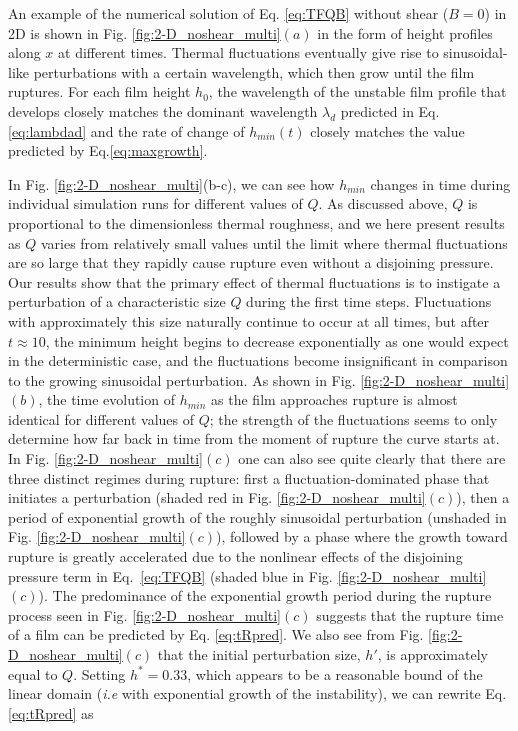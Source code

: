 \documentclass[
 onecolumn,
 amsmath,amssymb,
floatfix,superscriptaddress
]{revtex4-2}
\begin{document}
An example of the numerical solution of Eq. \eqref{eq:TFQB} without shear ($B=0$) in 2D is shown in Fig. \ref{fig:2-D_noshear_multi}$(a)$ in the form of height profiles along $x$ at different times. Thermal fluctuations eventually give rise to sinusoidal-like perturbations with a certain wavelength, which then grow until the film ruptures. For each film height $h_0$, the wavelength of the unstable film profile that develops closely matches the dominant wavelength $\lambda _d$ predicted in Eq. \eqref{eq:lambdad} and the rate of change of $h_{min}(t)$ closely matches the value predicted by Eq.\eqref{eq:maxgrowth}.

In Fig. \ref{fig:2-D_noshear_multi}(b-c), we can see how $h_{min}$ changes in time during individual simulation runs for different values of $Q$. As discussed above, $Q$ is proportional to the dimensionless thermal roughness, and we here present results as $Q$ varies from relatively small values until the limit where thermal fluctuations are so large that they rapidly cause rupture even without a disjoining pressure. Our results show that the primary effect of thermal fluctuations is to instigate a perturbation of a characteristic size $Q$ during the first time steps. Fluctuations  with approximately this size naturally continue to occur at all times, but after $t\approx 10$, the minimum height begins to decrease exponentially as one would expect in the deterministic case, and the fluctuations become insignificant in comparison to the growing sinusoidal perturbation. As shown in Fig. \ref{fig:2-D_noshear_multi}$(b)$, the time evolution of $h_{min}$ as the film approaches rupture is almost identical for different values of $Q$; the strength of the fluctuations seems to only determine how far back in time from the moment of rupture the curve starts at. In Fig. \ref{fig:2-D_noshear_multi}$(c)$ one can also see quite clearly that there are three distinct regimes during rupture: first a fluctuation-dominated phase that initiates a perturbation (shaded red in Fig. \ref{fig:2-D_noshear_multi}$(c)$), then a period of exponential growth of the roughly sinusoidal perturbation (unshaded in Fig. \ref{fig:2-D_noshear_multi}$(c)$), followed by a phase where the growth toward rupture is greatly accelerated due to the nonlinear effects of the disjoining pressure term in Eq.~\eqref{eq:TFQB} (shaded blue in Fig. \ref{fig:2-D_noshear_multi}$(c)$). The predominance of the exponential growth period during the rupture process seen in Fig. \ref{fig:2-D_noshear_multi}$(c)$ suggests that the rupture time of a film can be predicted by Eq. \eqref{eq:tRpred}. We also see from Fig. \ref{fig:2-D_noshear_multi}$(c)$ that the initial perturbation size, $h'$, is approximately equal to $Q$. Setting $h^*=0.33$, which appears to be a reasonable bound of the linear domain (\textit{i.e} with exponential growth of the instability), we can rewrite Eq. \eqref{eq:tRpred} as
\end{document}
